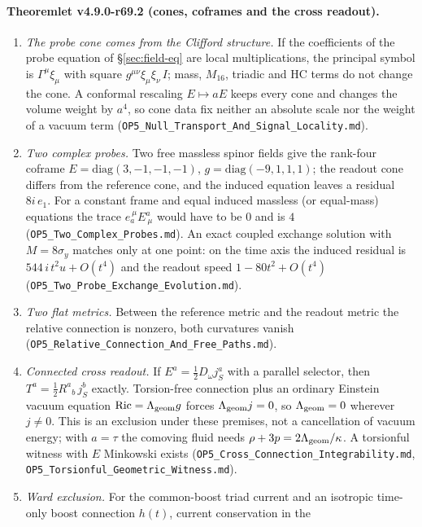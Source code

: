 \paragraph{Theoremlet v4.9.0-r69.2 (cones, coframes and the cross readout).}
\begin{enumerate}[leftmargin=2em]
\item[(a)] \emph{The probe cone comes from the Clifford structure.}  If the coefficients of the probe equation of \S\ref{sec:field-eq} are local
multiplications, the principal symbol is \(\Gamma^\mu\xi_\mu\) with square \(g^{\mu\nu}\xi_\mu\xi_\nu\,I\); mass, \(M_{16}\), triadic and HC terms do not
change the cone.  A conformal rescaling \(E\mapsto aE\) keeps every cone and changes the volume weight by \(a^4\), so cone data fix neither an absolute
scale nor the weight of a vacuum term (\texttt{OP5\_Null\_Transport\_And\_Signal\_Locality.md}).
\item[(b)] \emph{Two complex probes.}  Two free massless spinor fields give the rank-four coframe \(E=\mathrm{diag}(3,-1,-1,-1)\), \(g=\mathrm{diag}(-9,1,1,1)\);
the readout cone differs from the reference cone, and the induced equation leaves a residual \(8i\,e_1\).  For a constant frame and equal induced
massless (or equal-mass) equations the trace \(e_a^{\ \mu}E^a_{\ \mu}\) would have to be \(0\) and is \(4\) (\texttt{OP5\_Two\_Complex\_Probes.md}).  An exact coupled
exchange solution with \(M=8\sigma_y\) matches only at one point: on the time axis the induced residual is \(544\,i\,t^2u+O(t^4)\) and the readout speed
\(1-80t^2+O(t^4)\) (\texttt{OP5\_Two\_Probe\_Exchange\_Evolution.md}).
\item[(c)] \emph{Two flat metrics.}  Between the reference metric and the readout metric the relative connection is nonzero, both curvatures vanish
(\texttt{OP5\_Relative\_Connection\_And\_Free\_Paths.md}).
\item[(d)] \emph{Connected cross readout.}  If \(E^a=\tfrac12D_\omega j_S^a\) with a parallel selector, then \(T^a=\tfrac12R^a{}_b\,j_S^b\) exactly.  Torsion-free
connection plus an ordinary Einstein vacuum equation \(\mathrm{Ric}=\Lambda_{\rm geom}g\) forces \(\Lambda_{\rm geom}j=0\), so \(\Lambda_{\rm geom}=0\) wherever
\(j\neq0\).  This is an exclusion under these premises, not a cancellation of vacuum energy; with \(a=\tau\) the comoving fluid needs
\(\rho+3p=2\Lambda_{\rm geom}/\kappa\).  A torsionful witness with \(E\) Minkowski exists
(\texttt{OP5\_Cross\_Connection\_Integrability.md}, \texttt{OP5\_Torsionful\_Geometric\_Witness.md}).
\item[(e)] \emph{Ward exclusion.}  For the common-boost triad current and an isotropic time-only boost connection \(h(t)\), current conservation in the

\end{enumerate}
